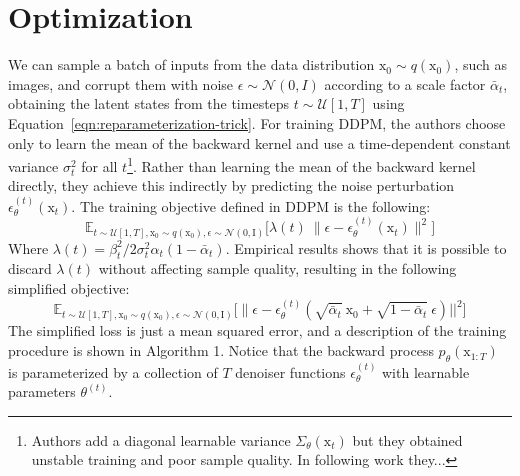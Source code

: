 \section{Optimization}

We can sample a batch of inputs from the data distribution $\mathrm{x}_{0}\sim q(\mathrm{x}_{0})$, such as images, and corrupt them with noise $\epsilon\sim\mathcal{N}(0, I)$ according to a scale factor $\bar{\alpha}_{t}$, obtaining the latent states from the timesteps $t\sim\mathcal{U}[1, T]$ using Equation~\ref{eqn:reparameterization-trick}. For training DDPM, the authors choose only to learn the mean of the backward kernel and use a time-dependent constant variance $\sigma_{t}^{2}$ for all $t$\footnote{Authors add a diagonal learnable variance $\Sigma_{\theta}(\mathrm{x}_{t})$ but they obtained unstable training and poor sample quality. In following work they...}. Rather than learning the mean of the backward kernel directly, they achieve this indirectly by predicting the noise perturbation $\epsilon_{\theta}^{(t)}(\mathrm{x}_{t})$. The training objective defined in DDPM is the following:
\begin{equation}\label{eqn:ho-eq12}
    \mathbb{E}_{t\sim\mathcal{U}[1, T], \mathrm{x}_{0}\sim q(\mathrm{x}_{0}), \epsilon\sim\mathcal{N}(0, \mathrm{I})}  \big[\lambda(t) ~ \|\epsilon - \epsilon_{\theta}^{(t)}(\mathrm{x}_{t}) \|^{2} \big]
\end{equation}
Where $\lambda(t)= \beta_{t}^{2} / 2\sigma_{t}^{2}\alpha_{t}(1-\bar{\alpha}_{t})$. Empirical results shows that it is possible to discard $\lambda(t)$ without affecting sample quality, resulting in the following simplified objective:
\begin{equation}\label{eqn:ho-eq14}
    \mathbb{E}_{t\sim\mathcal{U}[1, T], \mathrm{x}_{0}\sim q(\mathrm{x}_{0}), \epsilon\sim\mathcal{N}(0, \mathrm{I})} \big[\| \epsilon - \epsilon_{\theta}^{(t)}(\sqrt{\bar{\alpha}_{t}}~\mathrm{x}_{0} + \sqrt{1-\bar{\alpha}_{t}}~\epsilon) ||^{2} \big]
\end{equation}
The simplified loss is just a mean squared error, and a description of the
training procedure is shown in Algorithm 1. Notice that the backward process $p_{\theta}(\mathrm{x}_{1:T})$ is parameterized by a collection of $T$ denoiser functions $\epsilon_{\theta}^{(t)}$ with learnable parameters $\theta^{(t)}$.
